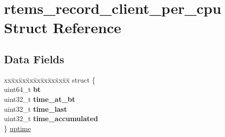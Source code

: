\hypertarget{structrtems__record__client__per__cpu}{}\section{rtems\+\_\+record\+\_\+client\+\_\+per\+\_\+cpu Struct Reference}
\label{structrtems__record__client__per__cpu}
\subsection*{Data Fields}
\begin{DoxyCompactItemize}
\item 
\mbox{\label{structrtems__record__client__per__cpu_afa468ba2e7fee7e41a97c68d5b211608}} 
\begin{tabbing}
xx\=xx\=xx\=xx\=xx\=xx\=xx\=xx\=xx\=\kill
struct \{\\
\>uint64\_t {\bfseries bt}\\
\>uint32\_t {\bfseries time\_at\_bt}\\
\>uint32\_t {\bfseries time\_last}\\
\>uint32\_t {\bfseries time\_accumulated}\\
\} \mbox{\hyperlink{structrtems__record__client__per__cpu_afa468ba2e7fee7e41a97c68d5b211608}{uptime}}\\


\end{tabbing}
\end{DoxyCompactItemize}
